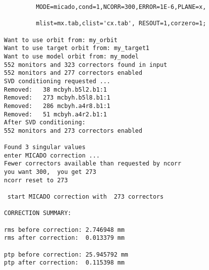 \begin{verbatim}
         MODE=micado,cond=1,NCORR=300,ERROR=1E-6,PLANE=x,

         mlist=mx.tab,clist='cx.tab', RESOUT=1,corzero=1;

Want to use orbit from: my_orbit
Want to use target orbit from: my_target1
Want to use model orbit from: my_model
552 monitors and 323 correctors found in input
552 monitors and 277 correctors enabled
SVD conditioning requested ...
Removed:   38 mcbyh.b5l2.b1:1
Removed:   273 mcbyh.b5l8.b1:1
Removed:   286 mcbyh.a4r8.b1:1
Removed:   51 mcbyh.a4r2.b1:1
After SVD conditioning:             
552 monitors and 273 correctors enabled

Found 3 singular values
enter MICADO correction ...
Fewer correctors available than requested by ncorr
you want 300,  you get 273
ncorr reset to 273
  
 start MICADO correction with  273 correctors
  
CORRECTION SUMMARY:   

rms before correction: 2.746948 mm
rms after correction:  0.013379 mm

ptp before correction: 25.945792 mm
ptp after correction:  0.115398 mm


\end{verbatim}
